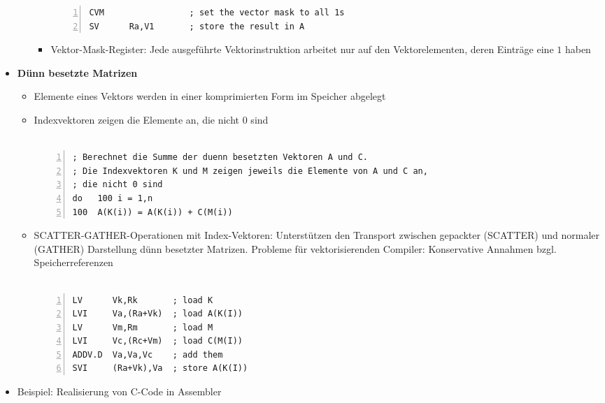 \begin{itemize}
\begin{itemize}
\begin{itemize}
\begin{minipage}{\linewidth}
\begin{lstlisting}[frame=single,numbers=left,mathescape,language={[mips]Assembler},tabsize=4]
CVM              	; set the vector mask to all 1s
SV 		Ra,V1       ; store the result in A
				\end{lstlisting}
				\end{minipage}
			\item Vektor-Mask-Register: Jede ausgeführte Vektorinstruktion arbeitet nur auf den Vektorelementen, deren Einträge eine \(1\) haben
		\end{itemize}
	\end{itemize}
	\item \textbf{Dünn besetzte Matrizen}
	\begin{itemize}
		\item Elemente eines Vektors werden in einer komprimierten Form im Speicher abgelegt
		\item Indexvektoren zeigen die Elemente an, die nicht \(0\) sind\\\\
			\begin{minipage}{\linewidth}
			\begin{lstlisting}[frame=single,numbers=left,mathescape,language={[mips]Assembler},tabsize=4]
; Berechnet die Summe der duenn besetzten Vektoren A und C.
; Die Indexvektoren K und M zeigen jeweils die Elemente von A und C an,
; die nicht 0 sind
do 	 100 i = 1,n
100  A(K(i)) = A(K(i)) + C(M(i))
			\end{lstlisting}
			\end{minipage}
		\item SCATTER-GATHER-Operationen mit Index-Vektoren: Unterstützen den Transport zwischen gepackter (SCATTER) und normaler (GATHER) Darstellung dünn besetzter Matrizen. Probleme für vektorisierenden Compiler: Konservative Annahmen bzgl. Speicherreferenzen\\\\
			\begin{minipage}{\linewidth}
			\begin{lstlisting}[frame=single,numbers=left,mathescape,language={[mips]Assembler},tabsize=4]
LV 		Vk,Rk 		; load K
LVI 	Va,(Ra+Vk) 	; load A(K(I))
LV 		Vm,Rm 		; load M
LVI 	Vc,(Rc+Vm) 	; load C(M(I))
ADDV.D 	Va,Va,Vc 	; add them
SVI 	(Ra+Vk),Va 	; store A(K(I))
			\end{lstlisting}
			\end{minipage}		
	\end{itemize}
	\item Beispiel: Realisierung von C-Code in Assembler\\\\
		\begin{minipage}{\linewidth}

\end{minipage}
\end{itemize}
